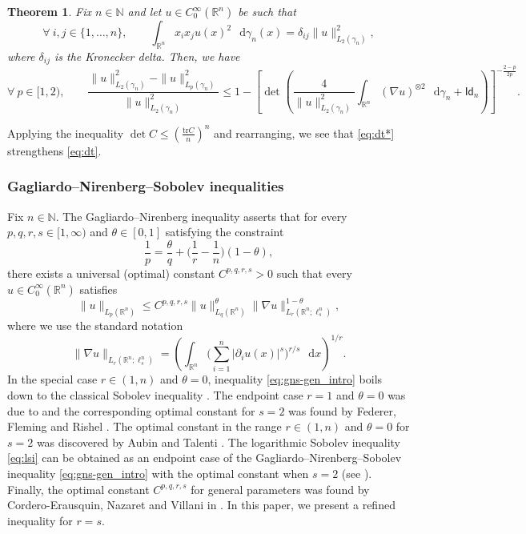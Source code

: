 \documentclass[a4paper,twoside,11pt,reqno]{amsart}
\newtheorem{theorem}{Theorem}
\newcommand*\diff{\mathop{}\!\mathrm{d}}
\newcommand{\R}{\mathbb{R}} %
\newcommand{\N}{\mathbb{N}}
\newcommand{\msf}{\mathsf}
\newcommand{\mr}{\mathrm}
\begin{document}
\begin{theorem} \label{thm:beckner}
Fix $n\in\N$ and let $u\in C_0^\infty(\R^n)$ be such that
\begin{equation}
\forall \ i,j\in\{1,\ldots,n\},\qquad \int_{\R^n} x_i x_j u(x)^2 \,\diff\gamma_n(x) = \delta_{ij} \|u\|_{L_2(\gamma_n)}^2,
\end{equation}
where $\delta_{ij}$ is the Kronecker delta. Then, we have
\begin{equation} \label{eq:dt*}
\forall \ p\in[1,2),\qquad \frac{\|u\|_{L_2(\gamma_n)}^2-\|u\|_{L_p(\gamma_n)}^2}{\|u\|_{L_2(\gamma_n)}^2} \leq 1-\left[\det\left(\frac{4}{\|u\|_{L_2(\gamma_n)}^2} \int_{\R^n} (\nabla u)^{\otimes 2} \,\diff\gamma_n + \msf{Id}_n\right)\right]^{-\frac{2-p}{2p}}.
\end{equation}
\end{theorem}

Applying the inequality $\det C \leq \left(\tfrac{\mr{tr} C}{n}\right)^n$ and rearranging, we see that \eqref{eq:dt*} strengthens \eqref{eq:dt}.

\subsubsection{Gagliardo--Nirenberg--Sobolev inequalities}
Fix $n\in\N$. The Gagliardo--Nirenberg inequality \cite{Gag59,Nir59} asserts that for every $p,q,r,s\in[1,\infty)$ and $\theta\in[0,1]$ satisfying the constraint
\begin{equation} \label{eq:gn_intro}
\frac{1}{p} = \frac{\theta}{q}+ \Big(\frac{1}{r}-\frac{1}{n}\Big) (1-\theta),
\end{equation}  
there exists a universal (optimal) constant $C^{p,q,r,s}>0$ such that every $u\in C_0^\infty(\R^n)$ satisfies
\begin{equation} \label{eq:gns-gen_intro}
\|u\|_{L_p(\R^n)} \leq C^{p,q,r,s}\|u\|_{L_q(\R^n)}^\theta \|\nabla u\|_{L_r(\R^n;\ell_s^n)}^{1-\theta},
\end{equation}
where we use the standard notation
\begin{equation}\label{eq:nabla_r_notation_intro}
\|\nabla u\|_{L_r(\R^n;\ell_s^n)} = \left( \int_{\R^n} \Big( \sum_{i=1}^n |\partial_i u(x)|^s \Big)^{r/s} \,\diff x\right)^{1/r}.
\end{equation}
In the special case $r\in(1,n)$ and $\theta=0$, inequality \eqref{eq:gns-gen_intro} boils down to the classical Sobolev inequality \cite{Sob38, Sob63}. The endpoint case $r=1$ and $\theta=0$ was due to \cite{Gag59,Nir59} and the corresponding optimal constant for $s=2$ was found by Federer, Fleming and Rishel \cite{FF60, FR60}. The optimal constant in the range $r\in(1,n)$ and $\theta=0$ for $s=2$ was discovered by Aubin and Talenti \cite{Aub76,Tal76}.  The logarithmic Sobolev inequality \eqref{eq:lsi} can be obtained as an endpoint case of the Gagliardo--Nirenberg--Sobolev inequality \eqref{eq:gns-gen_intro} with the optimal constant when $s=2$ (see \cite[Section~1]{dPD03}).  Finally,  the optimal constant $C^{p,q,r,s}$ for general parameters was found by Cordero-Erausquin, Nazaret and Villani in \cite[Section~3]{CNV04}.  In this paper, we present a refined inequality for $r=s$.
\end{document}
